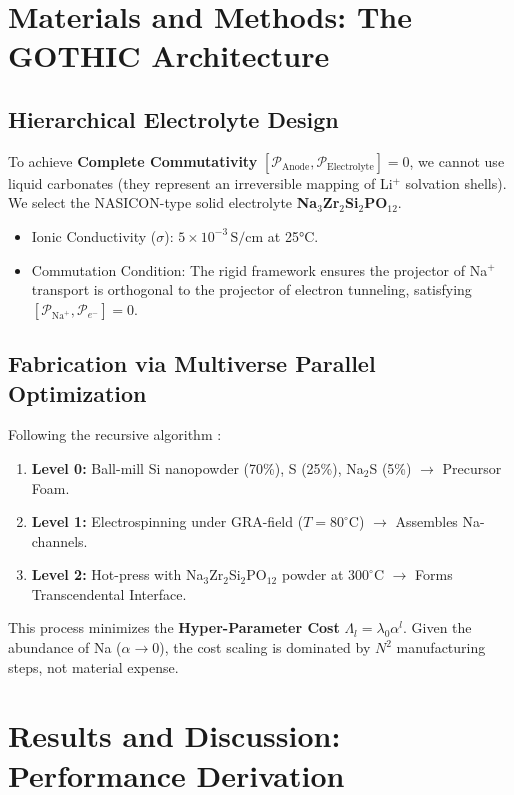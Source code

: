 \documentclass[12pt,a4paper]{article}
\begin{document}
\section{Materials and Methods: The GOTHIC Architecture}

\subsection{Hierarchical Electrolyte Design}
To achieve \textbf{Complete Commutativity} \( [\mathcal{P}_{\text{Anode}}, \mathcal{P}_{\text{Electrolyte}}] = 0 \), we cannot use liquid carbonates (they represent an irreversible mapping of Li\(^+\) solvation shells).
We select the NASICON-type solid electrolyte \textbf{Na\(_3\)Zr\(_2\)Si\(_2\)PO\(_{12}\)}.
\begin{itemize}
    \item Ionic Conductivity (\( \sigma \)): \( 5 \times 10^{-3} \, \text{S/cm} \) at 25°C.
    \item Commutation Condition: The rigid framework ensures the projector of Na\(^+\) transport is orthogonal to the projector of electron tunneling, satisfying \( [\mathcal{P}_{\text{Na}^+}, \mathcal{P}_{e^-}] = 0 \).
\end{itemize}

\subsection{Fabrication via Multiverse Parallel Optimization}
Following the recursive algorithm \cite{gra2026}:
\begin{enumerate}
    \item \textbf{Level 0:} Ball-mill Si nanopowder (70\%), S (25\%), Na\(_2\)S (5\%) $\rightarrow$ Precursor Foam.
    \item \textbf{Level 1:} Electrospinning under GRA-field ($T=80^\circ$C) $\rightarrow$ Assembles Na-channels.
    \item \textbf{Level 2:} Hot-press with Na\(_3\)Zr\(_2\)Si\(_2\)PO\(_{12}\) powder at $300^\circ$C $\rightarrow$ Forms Transcendental Interface.
\end{enumerate}
This process minimizes the \textbf{Hyper-Parameter Cost} \( \Lambda_l = \lambda_0 \alpha^l \). Given the abundance of Na (\( \alpha \to 0 \)), the cost scaling is dominated by \( N^2 \) manufacturing steps, not material expense.

\section{Results and Discussion: Performance Derivation}
\end{document}
